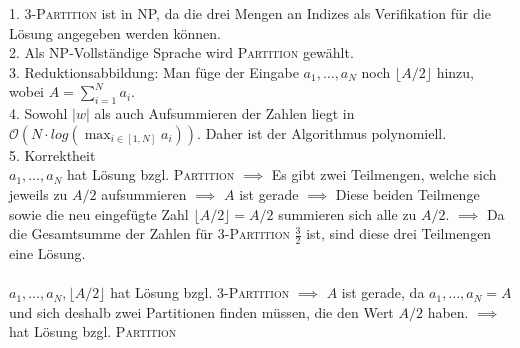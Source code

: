 1. \textsc{3-Partition} ist in NP, da die drei Mengen an Indizes als Verifikation für die Lösung angegeben werden können.\\
2. Als NP-Vollständige Sprache wird \textsc{Partition} gewählt.\\
3. Reduktionsabbildung: Man füge der Eingabe $a_1, \dots, a_N$ noch $\lfloor A/2 \rfloor$ hinzu, wobei $A=\sum_{i=1}^N a_i$.\\
4. Sowohl $|w|$ als auch Aufsummieren der Zahlen liegt in $\mathcal{O}(N \cdot log(\max_{i \in [1, N]} a_i))$. Daher ist der Algorithmus polynomiell.\\
5. Korrektheit\\
$a_1, \dots, a_N$ hat Lösung bzgl. \textsc{Partition} $\implies$ Es gibt zwei Teilmengen, welche sich jeweils zu $A/2$ aufsummieren $\implies$ $A$ ist gerade $\implies$ Diese beiden Teilmenge sowie die neu eingefügte Zahl $\lfloor A/2 \rfloor = A/2$ summieren sich alle zu $A/2$. $\implies$ Da die Gesamtsumme der Zahlen für \textsc{3-Partition} $\frac{3}{2}$ ist, sind diese drei Teilmengen eine Lösung.
\\ \ \\
$a_1, \dots, a_N, \lfloor A/2 \rfloor$ hat Lösung bzgl. \textsc{3-Partition} $\implies$ $A$ ist gerade, da $a_1, \dots, a_N = A$ und sich deshalb zwei Partitionen finden müssen, die den Wert $A/2$ haben. $\implies$ hat Lösung bzgl. \textsc{Partition}